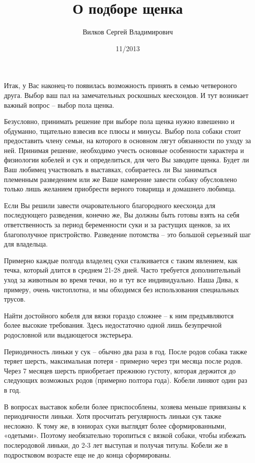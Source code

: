 \documentclass{article}
\title{О подборе щенка}
\author{Вилков Сергей Владимирович}
\date{11/2013}
\begin{document}
  \maketitle
  Итак, у Вас наконец-то появилась возможность принять в семью
  четвероного друга. Выбор ваш пал на замечательных роскошных
  кеесхондов. И тут возникает важный вопрос – выбор пола щенка.

  Безусловно, принимать решение при выборе пола щенка
  нужно взвешенно и обдуманно, тщательно взвесив все плюсы и
  минусы. Выбор пола собаки стоит предоставить члену семьи, на
  которого в основном лягут обязанности по уходу за ней. Принимая
  решение, необходимо учесть основные особенности характера и
  физиологии кобелей и сук и определиться, для чего Вы заводите
  щенка. Будет ли Ваш любимец участвовать в выставках, собираетесь
  ли Вы заниматься племенным разведением или же Ваше намерение
  завести собаку обусловлено только лишь желанием приобрести
  верного товарища и домашнего любимца.

  Если Вы решили завести очаровательного благородного кеесхонда
  для последующего разведения, конечно же, Вы должны быть готовы
  взять на себя ответственность за период беременности суки и за
  растущих щенков, за их благополучное пристройство. Разведение
  потомства – это большой серьезный шаг для владельца.

  Примерно каждые полгода владелец суки сталкивается с таким
  явлением, как течка, который длится в среднем 21-28 дней. Часто
  требуется дополнительный уход за животным во время течки, но и
  тут все индивидуально. Наша Дива, к примеру, очень чистоплотна,
  и мы обходимся без использования специальных трусов.

  Найти достойного кобеля для вязки гораздо сложнее – к ним
  предъявляются более высокие требования. Здесь недостаточно
  одной лишь безупречной родословной или выдающегося экстерьера.

  Периодичность линьки у сук – обычно два раза в год. После родов
  собака также теряет шерсть, максимальная потеря - примерно
  через три месяца после родов. Через 7 месяцев шерсть приобретает
  прежнюю густоту, которая держится до следующих возможных родов
  (примерно полтора года). Кобели линяют один раз в год.

  В вопросах выставок кобели более приспособлены, хозяева меньше
  привязаны к периодичности линьки. Хотя просчитать регулярность
  линьки сук также несложно. К тому же, в юниорах суки выглядят
  более сформированными, «одетыми». Поэтому необязательно
  торопиться с вязкой собаки, чтобы избежать послеродовой линьки,
  до 2-3 лет выступая и получая титулы. Кобели же в подростковом
  возрасте еще не до конца сформированы.
\end{document}
